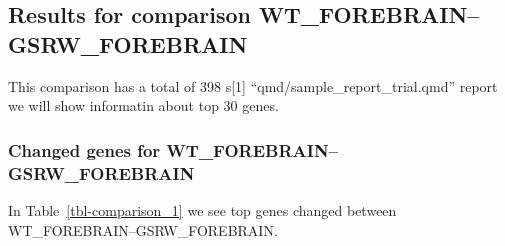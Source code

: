 \documentclass[
  letterpaper,
  DIV=11,
  numbers=noendperiod]{scrartcl}
\begin{document}
\hypertarget{results-for-comparison-wt_forebraingsrw_forebrain}{%
\subsection{Results for comparison
WT\_FOREBRAIN--GSRW\_FOREBRAIN}\label{results-for-comparison-wt_forebraingsrw_forebrain}}

This comparison has a total of 398 s{[}1{]}
``qmd/sample\_report\_trial.qmd'' report we will show informatin about
top 30 genes.

\hypertarget{changed-genes-for-wt_forebraingsrw_forebrain}{%
\subsubsection{Changed genes for
WT\_FOREBRAIN--GSRW\_FOREBRAIN}\label{changed-genes-for-wt_forebraingsrw_forebrain}}

In Table~\ref{tbl-comparison_1} we see top genes changed between
WT\_FOREBRAIN--GSRW\_FOREBRAIN.
\end{document}
